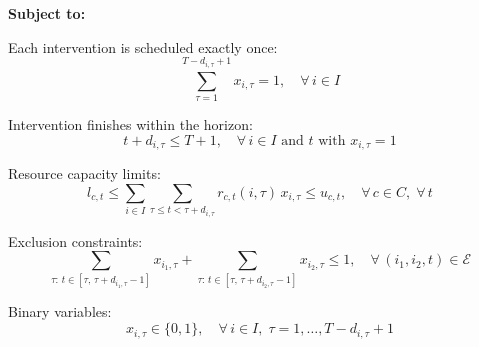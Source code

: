 \vspace{1em}
\noindent\textbf{Subject to:}

\noindent Each intervention is scheduled exactly once:
\[
\sum_{\tau=1}^{T-d_{i,\tau}+1} x_{i,\tau} = 1,\quad \forall\, i\in I
\]

\noindent Intervention finishes within the horizon:
\[
t + d_{i,\tau} \le T+1,\quad \forall\, i\in I \text{ and } t \text{ with } x_{i,\tau}=1
\]

\noindent Resource capacity limits:
\[
l_{c,t} \le \sum_{i\in I}\sum_{\tau \le t < \tau+d_{i,\tau}} r_{c,t}(i,\tau)\,x_{i,\tau} \le u_{c,t},\quad \forall\, c\in C,\; \forall\, t
\]

\noindent Exclusion constraints:
\[
\sum_{\tau:\, t\in [\tau,\,\tau+d_{i_1,\tau}-1]} x_{i_1,\tau} + \sum_{\tau:\, t\in [\tau,\,\tau+d_{i_2,\tau}-1]} x_{i_2,\tau} \le 1,\quad \forall\,(i_1,i_2,t)\in \mathcal{E}
\]

\noindent Binary variables:
\[
x_{i,\tau} \in \{0,1\},\quad \forall\, i\in I,\; \tau=1,\ldots,T-d_{i,\tau}+1
\]


